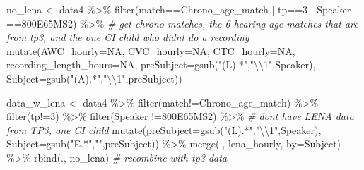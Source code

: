 \documentclass[
]{article}
\newenvironment{Shaded}{\begin{snugshade}}{\end{snugshade}}
\newcommand{\AttributeTok}[1]{\textcolor[rgb]{0.77,0.63,0.00}{#1}}
\newcommand{\CommentTok}[1]{\textcolor[rgb]{0.56,0.35,0.01}{\textit{#1}}}
\newcommand{\ConstantTok}[1]{\textcolor[rgb]{0.00,0.00,0.00}{#1}}
\newcommand{\FunctionTok}[1]{\textcolor[rgb]{0.00,0.00,0.00}{#1}}
\newcommand{\NormalTok}[1]{#1}
\newcommand{\OtherTok}[1]{\textcolor[rgb]{0.56,0.35,0.01}{#1}}
\newcommand{\SpecialCharTok}[1]{\textcolor[rgb]{0.00,0.00,0.00}{#1}}
\newcommand{\StringTok}[1]{\textcolor[rgb]{0.31,0.60,0.02}{#1}}
\begin{document}
\begin{Shaded}
\begin{Highlighting}[]
\NormalTok{no\_lena }\OtherTok{\textless{}{-}}\NormalTok{ data4 }\SpecialCharTok{\%\textgreater{}\%} 
  \FunctionTok{filter}\NormalTok{(match}\SpecialCharTok{==}\StringTok{\textquotesingle{}Chrono\_age\_match\textquotesingle{}} \SpecialCharTok{|}\NormalTok{ tp}\SpecialCharTok{==}\StringTok{\textquotesingle{}3\textquotesingle{}} \SpecialCharTok{|}\NormalTok{ Speaker }\SpecialCharTok{==}\StringTok{\textquotesingle{}800E65MS2\textquotesingle{}}\NormalTok{) }\SpecialCharTok{\%\textgreater{}\%} \CommentTok{\# get chrono matches,  the 6 hearing age matches that are from tp3, and the one CI child who didn\textquotesingle{}t do a recording }
  \FunctionTok{mutate}\NormalTok{(}\AttributeTok{AWC\_hourly=}\ConstantTok{NA}\NormalTok{,}
         \AttributeTok{CVC\_hourly=}\ConstantTok{NA}\NormalTok{,}
         \AttributeTok{CTC\_hourly=}\ConstantTok{NA}\NormalTok{,}
         \AttributeTok{recording\_length\_hours=}\ConstantTok{NA}\NormalTok{,}
         \AttributeTok{preSubject=}\FunctionTok{gsub}\NormalTok{(}\StringTok{"(L).*"}\NormalTok{,}\StringTok{"}\SpecialCharTok{\textbackslash{}\textbackslash{}}\StringTok{1"}\NormalTok{,Speaker),}
         \AttributeTok{Subject=}\FunctionTok{gsub}\NormalTok{(}\StringTok{"(A).*"}\NormalTok{,}\StringTok{"}\SpecialCharTok{\textbackslash{}\textbackslash{}}\StringTok{1"}\NormalTok{,preSubject))}

\NormalTok{data\_w\_lena }\OtherTok{\textless{}{-}}\NormalTok{ data4 }\SpecialCharTok{\%\textgreater{}\%}
  \FunctionTok{filter}\NormalTok{(match}\SpecialCharTok{!=}\StringTok{\textquotesingle{}Chrono\_age\_match\textquotesingle{}}\NormalTok{) }\SpecialCharTok{\%\textgreater{}\%}
  \FunctionTok{filter}\NormalTok{(tp}\SpecialCharTok{!=}\StringTok{\textquotesingle{}3\textquotesingle{}}\NormalTok{) }\SpecialCharTok{\%\textgreater{}\%} 
  \FunctionTok{filter}\NormalTok{(Speaker }\SpecialCharTok{!=}\StringTok{\textquotesingle{}800E65MS2\textquotesingle{}}\NormalTok{) }\SpecialCharTok{\%\textgreater{}\%} \CommentTok{\# don\textquotesingle{}t have LENA data from TP3, one CI child}
  \FunctionTok{mutate}\NormalTok{(}\AttributeTok{preSubject=}\FunctionTok{gsub}\NormalTok{(}\StringTok{"(L).*"}\NormalTok{,}\StringTok{"}\SpecialCharTok{\textbackslash{}\textbackslash{}}\StringTok{1"}\NormalTok{,Speaker),}
         \AttributeTok{Subject=}\FunctionTok{gsub}\NormalTok{(}\StringTok{"E.*"}\NormalTok{,}\StringTok{""}\NormalTok{,preSubject)) }\SpecialCharTok{\%\textgreater{}\%}
  \FunctionTok{merge}\NormalTok{(., lena\_hourly, }\AttributeTok{by=}\StringTok{\textquotesingle{}Subject\textquotesingle{}}\NormalTok{) }\SpecialCharTok{\%\textgreater{}\%}
  \FunctionTok{rbind}\NormalTok{(., no\_lena) }\CommentTok{\# recombine with tp3 data}


\end{Highlighting}
\end{Shaded}
\end{document}
